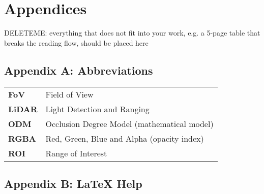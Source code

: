 \chapter*{Appendices}
\label{appendices}
DELETEME: everything that does not fit into your work, e.g. a 5-page table that breaks the reading flow, should be placed here

{}
\section*{Appendix A: Abbreviations}
\begin{center}
\begin{tabular}{ll}
\textbf{FoV}	&	Field of View\\
\textbf{LiDAR}	&	Light Detection and Ranging\\
\textbf{ODM}	&	Occlusion Degree Model (mathematical model)\\
\textbf{RGBA}	&	Red, Green, Blue and Alpha (opacity index)\\
\textbf{ROI}	&	Range of Interest\\
\end{tabular}
\end{center}

\newpage
\section*{Appendix B: {\LaTeX} Help}

